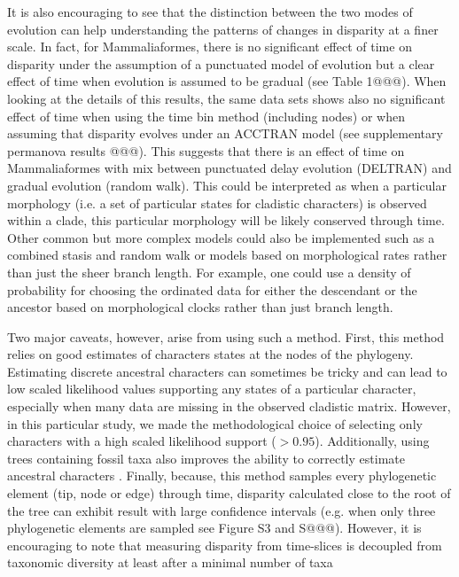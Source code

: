 \documentclass[12pt,letterpaper]{article}
\begin{document}
\begin{enumerate}
    It is also encouraging to see that the distinction between the two modes of evolution can help understanding the patterns of changes in disparity at a finer scale.
    In fact, for Mammaliaformes, there is no significant effect of time on disparity under the assumption of a punctuated model of evolution but a clear effect of time when evolution is assumed to be gradual (see Table 1@@@).
    When looking at the details of this results, the same data sets shows also no significant effect of time when using the time bin method (including nodes) or when assuming that disparity evolves under an ACCTRAN model (see supplementary permanova results @@@).
    This suggests that there is an effect of time on Mammaliaformes with mix between punctuated delay evolution (DELTRAN) and gradual evolution (random walk).
    This could be interpreted as when a particular morphology (i.e. a set of particular states for cladistic characters) is observed within a clade, this particular morphology will be likely conserved through time.
    Other common but more complex models could also be implemented such as a combined stasis and random walk \citep{Hunt21042015} or models based on morphological rates rather than just the sheer branch length.
    For example, one could use a density of probability for choosing the ordinated data for either the descendant or the ancestor based on morphological clocks rather than just branch length.
\end{enumerate}
Two major caveats, however, arise from using such a method.
First, this method relies on good estimates of characters states at the nodes of the phylogeny.
Estimating discrete ancestral characters can sometimes be tricky and can lead to low scaled likelihood values supporting any states of a particular character, especially when many data are missing in the observed cladistic matrix.
However, in this particular study, we made the methodological choice of selecting only characters with a high scaled likelihood support ($> 0.95$).
Additionally, using trees containing fossil taxa also improves the ability to correctly estimate ancestral characters \citep{Poly2001,Finarelli2006,Albert2009,Slater2012MEE}.
Finally, because, this method samples every phylogenetic element (tip, node or edge) through time, disparity calculated close to the root of the tree can exhibit result with large confidence intervals (e.g. when only three phylogenetic elements are sampled see Figure S3 and S@@@).
However, it is encouraging to note that measuring disparity from time-slices is decoupled from taxonomic diversity at least after a minimal number of taxa \citep{slaterCetacean,ruta2013,hopkinsdecoupling2013}
\end{document}
